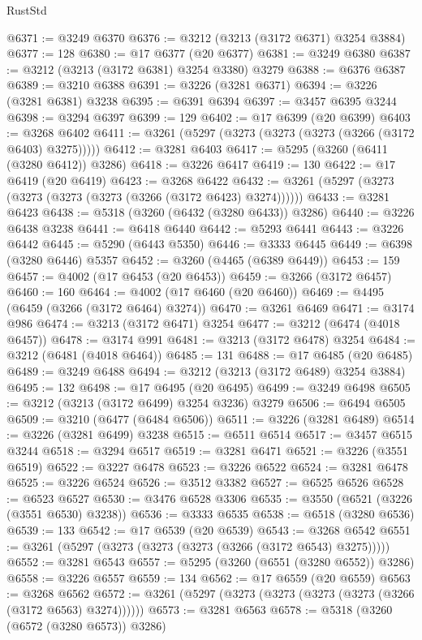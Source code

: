 \begin{lexlean}{RustStd}
\begin{coremodule}
@6371 := @3249 @6370
@6376 := @3212 (@3213 (@3172 @6371) @3254 @3884)
@6377 := 128
@6380 := @17 @6377 (@20 @6377)
@6381 := @3249 @6380
@6387 := @3212 (@3213 (@3172 @6381) @3254 @3380) @3279
@6388 := @6376 @6387
@6389 := @3210 @6388
@6391 := @3226 (@3281 @6371)
@6394 := @3226 (@3281 @6381) @3238
@6395 := @6391 @6394
@6397 := @3457 @6395 @3244
@6398 := @3294 @6397
@6399 := 129
@6402 := @17 @6399 (@20 @6399)
@6403 := @3268 @6402
@6411 := @3261 (@5297 (@3273 (@3273 (@3273 (@3266 (@3172 @6403) @3275)))))
@6412 := @3281 @6403
@6417 := @5295 (@3260 (@6411 (@3280 @6412)) @3286)
@6418 := @3226 @6417
@6419 := 130
@6422 := @17 @6419 (@20 @6419)
@6423 := @3268 @6422
@6432 := @3261 (@5297 (@3273 (@3273 (@3273 (@3273 (@3266 (@3172 @6423) @3274))))))
@6433 := @3281 @6423
@6438 := @5318 (@3260 (@6432 (@3280 @6433)) @3286)
@6440 := @3226 @6438 @3238
@6441 := @6418 @6440
@6442 := @5293 @6441
@6443 := @3226 @6442
@6445 := @5290 (@6443 @5350)
@6446 := @3333 @6445
@6449 := @6398 (@3280 @6446) @5357
@6452 := @3260 (@4465 (@6389 @6449))
@6453 := 159
@6457 := @4002 (@17 @6453 (@20 @6453))
@6459 := @3266 (@3172 @6457)
@6460 := 160
@6464 := @4002 (@17 @6460 (@20 @6460))
@6469 := @4495 (@6459 (@3266 (@3172 @6464) @3274))
@6470 := @3261 @6469
@6471 := @3174 @986
@6474 := @3213 (@3172 @6471) @3254
@6477 := @3212 (@6474 (@4018 @6457))
@6478 := @3174 @991
@6481 := @3213 (@3172 @6478) @3254
@6484 := @3212 (@6481 (@4018 @6464))
@6485 := 131
@6488 := @17 @6485 (@20 @6485)
@6489 := @3249 @6488
@6494 := @3212 (@3213 (@3172 @6489) @3254 @3884)
@6495 := 132
@6498 := @17 @6495 (@20 @6495)
@6499 := @3249 @6498
@6505 := @3212 (@3213 (@3172 @6499) @3254 @3236) @3279
@6506 := @6494 @6505
@6509 := @3210 (@6477 (@6484 @6506))
@6511 := @3226 (@3281 @6489)
@6514 := @3226 (@3281 @6499) @3238
@6515 := @6511 @6514
@6517 := @3457 @6515 @3244
@6518 := @3294 @6517
@6519 := @3281 @6471
@6521 := @3226 (@3551 @6519)
@6522 := @3227 @6478
@6523 := @3226 @6522
@6524 := @3281 @6478
@6525 := @3226 @6524
@6526 := @3512 @3382
@6527 := @6525 @6526
@6528 := @6523 @6527
@6530 := @3476 @6528 @3306
@6535 := @3550 (@6521 (@3226 (@3551 @6530) @3238))
@6536 := @3333 @6535
@6538 := @6518 (@3280 @6536)
@6539 := 133
@6542 := @17 @6539 (@20 @6539)
@6543 := @3268 @6542
@6551 := @3261 (@5297 (@3273 (@3273 (@3273 (@3266 (@3172 @6543) @3275)))))
@6552 := @3281 @6543
@6557 := @5295 (@3260 (@6551 (@3280 @6552)) @3286)
@6558 := @3226 @6557
@6559 := 134
@6562 := @17 @6559 (@20 @6559)
@6563 := @3268 @6562
@6572 := @3261 (@5297 (@3273 (@3273 (@3273 (@3273 (@3266 (@3172 @6563) @3274))))))
@6573 := @3281 @6563
@6578 := @5318 (@3260 (@6572 (@3280 @6573)) @3286)

\end{coremodule}
\end{lexlean}
